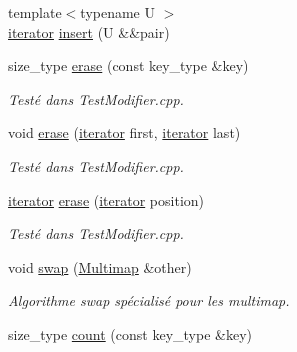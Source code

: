 \begin{DoxyCompactItemize}
\item 
{\footnotesize template$<$typename U $>$ }\\\hyperlink{classMultimapIterator}{iterator} \hyperlink{classMultimap_ad4cd112230c4781aa25f66d78f858dd6}{insert} (U \&\&pair)
\item 
\mbox{\label{classMultimap_af134f60e6bcb55a66618d45216c1eef9}} 
size\+\_\+type \hyperlink{classMultimap_af134f60e6bcb55a66618d45216c1eef9}{erase} (const key\+\_\+type \&key)
\begin{DoxyCompactList}\small\item\em Testé dans Test\+Modifier.\+cpp. \end{DoxyCompactList}\item 
\mbox{\label{classMultimap_a96fdc3f12cbd0af9188dbe556fe0022e}} 
void \hyperlink{classMultimap_a96fdc3f12cbd0af9188dbe556fe0022e}{erase} (\hyperlink{classMultimapIterator}{iterator} first, \hyperlink{classMultimapIterator}{iterator} last)
\begin{DoxyCompactList}\small\item\em Testé dans Test\+Modifier.\+cpp. \end{DoxyCompactList}\item 
\mbox{\label{classMultimap_a9e9a35856b2ec08ffe2e05c9e97033e9}} 
\hyperlink{classMultimapIterator}{iterator} \hyperlink{classMultimap_a9e9a35856b2ec08ffe2e05c9e97033e9}{erase} (\hyperlink{classMultimapIterator}{iterator} position)
\begin{DoxyCompactList}\small\item\em Testé dans Test\+Modifier.\+cpp. \end{DoxyCompactList}\item 
\mbox{\label{classMultimap_aacaf7aaeab79c30b3a19b85a10a56f7c}} 
void \hyperlink{classMultimap_aacaf7aaeab79c30b3a19b85a10a56f7c}{swap} (\hyperlink{classMultimap}{Multimap} \&other)
\begin{DoxyCompactList}\small\item\em Algorithme swap spécialisé pour les multimap. \end{DoxyCompactList}\item 
\mbox{\label{classMultimap_a2feb4082ad4884bc49e68bb4815769db}} 
size\+\_\+type \hyperlink{classMultimap_a2feb4082ad4884bc49e68bb4815769db}{count} (const key\+\_\+type \&key)

\end{DoxyCompactItemize}
